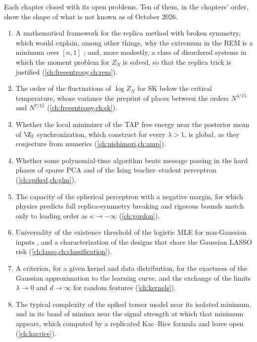 \begin{refsection}
Each chapter closed with its open problems. Ten of them, in the chapters' order, show the shape of what is not known as of October 2026.
\begin{enumerate}
\item A mathematical framework for the replica method with broken symmetry, which would explain, among other things, why the extremum in the REM is a minimum over $[n,1]$ \parencite[notes to ch.~8]{MezardMontanari2009}; and, more modestly, a class of disordered systems in which the moment problem for $Z_N$ is solved, so that the replica trick is justified \parencite{Tanaka2007} (\cref{ch:freeentropy,ch:rem}).
\item The order of the fluctuations of $\log Z_N$ for SK below the critical temperature, whose variance the preprint of \textcite{AronowLopatto2026a} places between the orders $N^{4/15}$ and $N^{7/15}$ (\cref{ch:freeentropy,ch:sk}).
\item Whether the local minimizer of the TAP free energy near the posterior mean of $\Z_2$ synchronization, which \textcite{CelentanoFanMei2023} construct for every $\lambda>1$, is global, as they conjecture from numerics (\cref{ch:nishimori,ch:amp}).
\item Whether some polynomial-time algorithm beats message passing in the hard phases of sparse PCA \parencite{LesieurKrzakalaZdeborova2017} and of the Ising teacher--student perceptron \parencite{BarbierEtAl2019} (\cref{ch:spiked,ch:glm}).
\item The capacity of the spherical perceptron with a negative margin, for which physics predicts full replica-symmetry breaking \parencite{FranzEtAl2017} and rigorous bounds match only to leading order as $\kappa\to-\infty$ \parencite{MontanariZhongZhou2024} (\cref{ch:gordon}).
\item Universality of the existence threshold of the logistic MLE for non-Gaussian inputs \parencite[Sec.~5]{CandesSur2020}, and a characterization of the designs that share the Gaussian LASSO risk (\cref{ch:lasso,ch:classification}).
\item A criterion, for a given kernel and data distribution, for the exactness of the Gaussian approximation to the learning curve, and the exchange of the limits $\lambda\to0$ and $d\to\infty$ for random features \parencite[Remark~1]{MeiMontanari2022} (\cref{ch:kernels}).
\item The typical complexity of the spiked tensor model near its isolated minimum, and in its band of minima near the signal strength at which that minimum appears, which \textcite{RosEtAl2019} computed by a replicated Kac--Rice formula and \textcite{BenArousMeiMontanariNica2019} leave open (\cref{ch:kacrice}).

\end{enumerate}
\end{refsection}
